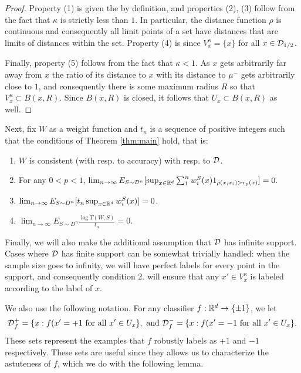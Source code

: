 \begin{proof}
Property (1) is given the by definition, and properties (2), (3) follow from the fact that $\kappa$ is strictly less than $1$. In particular, the distance function $\rho$ is continuous and consequently all limit points of a set have distances that are limits of distances within the set. Property (4) is since $V_x^\kappa = \{x\}$ for all $x \in {\mathcal D}_{1/2}$. 

Finally, property (5) follows from the fact that $\kappa < 1$. As $x$ gets arbitrarily far away from $x$ the ratio of its distance to $x$ with its distance to $\mu^-$ gets arbitrarily close to $1$, and consequently there is some maximum radius $R$ so that $V_x^\kappa \subset B(x, R)$. Since $B(x, R)$ is closed, it follows that $U_x \subset B(x, R)$ as well. 
\end{proof}

Next, fix $W$ as a weight function and $t_n$ is a sequence of positive integers such that the conditions of Theorem \ref{thm:main} hold, that is: 
\begin{enumerate}
	\item $W$ is consistent (with resp. to accuracy) with resp. to ${\mathcal D}$.
	\item For any $0 < p < 1$, $\lim_{n \to \infty} E_{S \sim {\mathcal D}^n} [\sup_{x \in \mathbb R^d} \sum_1^n w_i^S(x)1_{\rho(x, x_i) > r_p(x)}] = 0.$
	\item $\lim_{n \to \infty} E_{S \sim D^n}[t_n \sup_{x \in \mathbb R^d} w_i^S(x)] = 0$.
	\item $\lim_{n \to \infty} E_{S \sim D^n}\frac{\log T(W,S)}{t_n} = 0$.
\end{enumerate}

Finally, we will also make the additional assumption that ${\mathcal D}$ has infinite support. Cases where ${\mathcal D}$ has finite support can be somewhat trivially handled: when the sample size goes to infinity, we will have perfect labels for every point in the support, and consequently condition 2. will ensure that any $x' \in V_x^\kappa$ is labeled according to the label of $x$. 


We also use the following notation. For any classifier $f: \mathbb R^d \to \{\pm 1\}$, we let \begin{equation}\label{eqn:cool_sets}{\mathcal D}_f^+ = \{x: f(x' = +1\text{ for all }x' \in U_x\},\text{ and }{\mathcal D}_f^- = \{x: f(x' = -1\text{ for all }x' \in U_x\}.\end{equation} These sets represent the examples that $f$ robustly labels as $+1$ and $-1$ respectively. These sets are useful since they allows us to characterize the astuteness of $f$, which we do with the following lemma.

